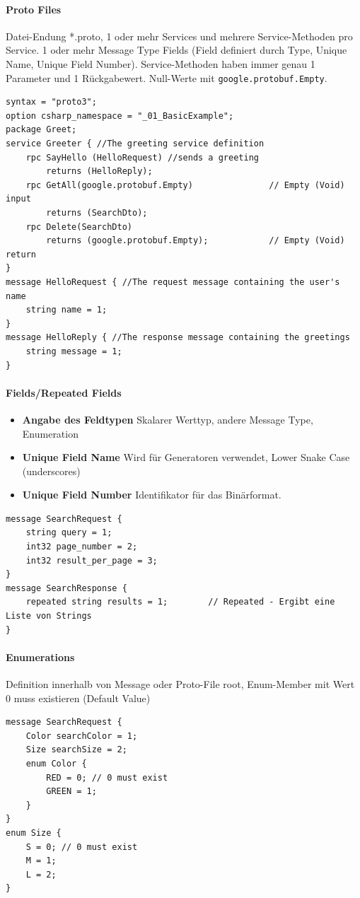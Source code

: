 \documentclass[
a4paper,
oneside,
10pt,
fleqn,
headsepline,
toc=listofnumbered, 
bibliography=totocnumbered]{scrartcl}
\begin{document}
\paragraph{Proto Files} Datei-Endung *.proto, 1 oder mehr Services und mehrere Service-Methoden pro Service. 1 oder mehr Message Type Fields (Field definiert durch Type, Unique Name, Unique Field Number). Service-Methoden haben immer genau 1 Parameter und 1 Rückgabewert. Null-Werte mit \lstinline|google.protobuf.Empty|.
\begin{lstlisting}
syntax = "proto3";
option csharp_namespace = "_01_BasicExample";
package Greet;
service Greeter { //The greeting service definition
    rpc SayHello (HelloRequest) //sends a greeting
        returns (HelloReply);
    rpc GetAll(google.protobuf.Empty)               // Empty (Void) input
        returns (SearchDto);
    rpc Delete(SearchDto)
		returns (google.protobuf.Empty);            // Empty (Void) return
}
message HelloRequest { //The request message containing the user's name
    string name = 1;
}
message HelloReply { //The response message containing the greetings
    string message = 1;
}
\end{lstlisting}

\paragraph{Fields/Repeated Fields}
\begin{itemize}
    \item \textbf{Angabe des Feldtypen} Skalarer Werttyp, andere Message Type, Enumeration
    \item \textbf{Unique Field Name} Wird für Generatoren verwendet, Lower Snake Case (underscores)
    \item \textbf{Unique Field Number} Identifikator für das Binärformat.
\end{itemize}
\begin{lstlisting}
message SearchRequest {
    string query = 1;
    int32 page_number = 2;
    int32 result_per_page = 3;
}
message SearchResponse {
    repeated string results = 1;        // Repeated - Ergibt eine Liste von Strings
}
\end{lstlisting}

\paragraph{Enumerations} Definition innerhalb von Message oder Proto-File root, Enum-Member mit Wert 0 muss existieren (Default Value)
\begin{lstlisting}
message SearchRequest {
    Color searchColor = 1;
    Size searchSize = 2;
    enum Color {
        RED = 0; // 0 must exist
        GREEN = 1;
    }
}
enum Size {
    S = 0; // 0 must exist
    M = 1;
    L = 2;
}
\end{lstlisting}
\end{document}
